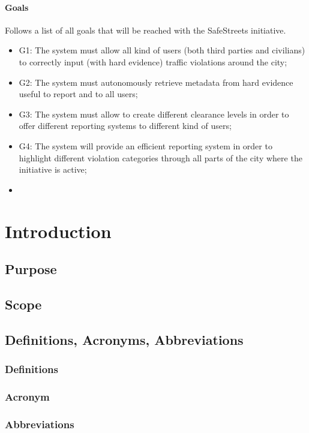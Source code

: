 \documentclass{article}
\begin{document}
    \paragraph{Goals} Follows a list of all goals that will be reached with the SafeStreets initiative.
    \begin{itemize}
        \item G1: The system must allow all kind of users (both third parties and civilians) to correctly input (with hard evidence) traffic violations around the city;
        \item G2: The system must autonomously retrieve metadata from hard evidence useful to report and to all users;
        \item G3: The system must allow to create different clearance levels in order to offer different reporting systems to different kind of users;
        \item G4: The system will provide an efficient reporting system in order to highlight different violation categories through all parts of the city where the initiative is active;
        \item 
    \end{itemize}

\tableofcontents
\newpage

\section{Introduction}
\subsection{Purpose}
\subsection{Scope}
\subsection{Definitions, Acronyms, Abbreviations}
\subsubsection{Definitions}
\subsubsection{Acronym}
\subsubsection{Abbreviations}
\end{document}
